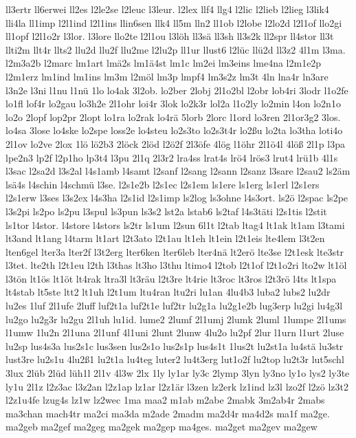 {ll3ertr
ll6erwei
ll2es
l2le2se
l2leuc
l3leur.
l2lex
llf4
llg4
l2lic
l2lieb
l2lieg
l3lik4
lli4la
ll1imp
l2l1ind
l2l1ins
llin6sen
llk4
ll5m
lln2
ll1ob
l2lobe
l2lo2d
l2l1of
llo2gi
ll1opf
l2l1o2r
l3lor.
l3lore
llo2te
l2l1ou
l3löh
ll3sä
ll3sh
ll3s2k
ll2spr
ll4stor
ll3t
llti2m
llt4r
llts2
llu2d
llu2f
llu2me
l2lu2p
ll1ur
llust6
l2lüc
llü2d
ll3z2
4l1m
l3ma.
l2m3a2b
l2marc
lm1art
lmä2s
lm1ä4st
lm1c
lm2ei
lm3eins
lme4na
l2m1e2p
l2m1erz
lm1ind
lm1ins
lm3m
l2möl
lm3p
lmpf4
lm3s2z
lm3t
4ln
lna4r
ln3are
l3n2e
l3ni
l1nu
l1nü
1lo
lo4ak
3l2ob.
lo2ber
2lobj
2l1o2bl
l2obr
lob4ri
3lodr
l1o2fe
lo1fl
lof4r
lo2gau
lo3h2e
2l1ohr
loi4r
3lok
lo2k3r
lol2a
l1o2ly
lo2min
l4on
lo2n1o
lo2o
2lopf
lop2pr
2lopt
lo1ra
lo2rak
lo4rä
5lorb
2lorc
l1ord
lo3ren
2l1or3g2
3los.
lo4sa
3lose
lo4ske
lo2spe
loss2e
lo4steu
lo2s3to
lo2s3t4r
lo2ßu
lo2ta
lo3tha
loti4o
2l1ov
lo2ve
2lox
1lö
lö2b3
2löck
2löd
l2ö2f
2l3öfe
4lög
l1öhr
2l1ö4l
4löß
2l1p
l3pa
lpe2n3
lp2f
l2p1ho
lp3t4
l3pu
2l1q
2l3r2
lra4ss
lrat4s
lrö4
lrös3
lrut4
lrü1b
4l1s
l3sac
l2sa2d
l3s2al
l4s1amb
l4samt
l2sanf
l2sang
l2sann
l2sanz
l3sare
l2sau2
ls2äm
lsä4s
l4schin
l4schmü
l3se.
l2s1e2b
l2s1ec
l2s1em
ls1ere
ls1erg
ls1erl
l2s1ers
l2s1erw
l3ses
l3s2ex
l4s3ha
l2s1id
l2s1imp
ls2log
ls3ohne
l4s3ort.
ls2ö
l2spac
ls2pe
l3s2pi
ls2po
ls2pu
l3spul
ls3pun
ls3s2
lst2a
lstab6
ls2taf
l4s3täti
l2s1tis
l2stit
ls1tor
l4stor.
l4store
l4stors
ls2tr
ls1um
l2sun
6l1t
l2tab
ltag4
lt1ak
lt1am
l3tami
lt3and
lt1ang
l4tarm
lt1art
l2t3ato
l2t1au
lt1eh
lt1ein
l2t1eis
lte4lem
l3t2en
lten6gel
lter3a
lter2f
l3t2erg
lter6ken
lter6leb
lter4nä
lt2erö
lte3se
l2t1esk
lte3str
l3tet.
lte2th
l2t1eu
l2th
l3thas
lt3ho
l3thu
ltimo4
l2tob
l2t1of
l2t1o2ri
lto2w
lt1öl
l3tön
lt1ös
lt1öt
lt4rak
ltra3l
lt3räu
l2t3re
lt4rie
lt3roc
lt3ros
l2t3rö
l4ts
lt1spa
lt4stab
lt5ste
ltt2
lt1uh
l2t1um
ltu4ran
ltu2ri
lu1an
4lu4b3
luba2
lubs2
lu2dr
lu2es
1luf
2l1ufe
2luff
luf2t1a
luf2t1e
luf2tr
lu2g1a
lu2g1e2b
lug3erp
lu2gi
lu4g3l
lu2go
lu2g3r
lu2gu
2l1uh
lu1id.
lume2
2lumf
2l1umj
2lumk
2luml
1lumpe
2l1ums
l1umw
1lu2n
2l1una
2l1unf
4l1uni
2lunt
2lunw
4lu2o
lu2pf
2lur
l1urn
l1urt
2luse
lu2sp
lus4s3a
lus2s1c
lus3sen
lus2s1o
lus2s1p
lus4s1t
1lus2t
lu2st1a
lu4stä
lu3str
lust3re
lu2s1u
4lu2ß1
lu2t1a
lu4teg
luter2
lu4t3erg
lut1o2f
lu2top
lu2t3r
lut5schl
3lux
2lüb
2lüd
lüh1l
2l1v
4l3w
2lx
1ly
ly1ar
ly3c
2lymp
3lyn
ly3no
ly1o
lys2
ly3te
ly1u
2l1z
l2z3ac
l3z2an
l2z1ap
lz1ar
l2z1är
l3zen
lz2erk
lz1ind
lz3l
lzo2f
l2zö
lz3t2
l2z1u4fe
lzug4s
lz1w
lz2wec
1ma
maa2
m1ab
m2abe
2mabk
3m2ab4r
2mabs
ma3chan
mach4tr
ma2ci
ma3da
m2ade
2madm
ma2d4r
ma4d2s
ma1f
ma2ge.
ma2geb
ma2gef
ma2geg
ma2gek
ma2gep
ma4ges.
ma2get
ma2gev
ma2gew
}
